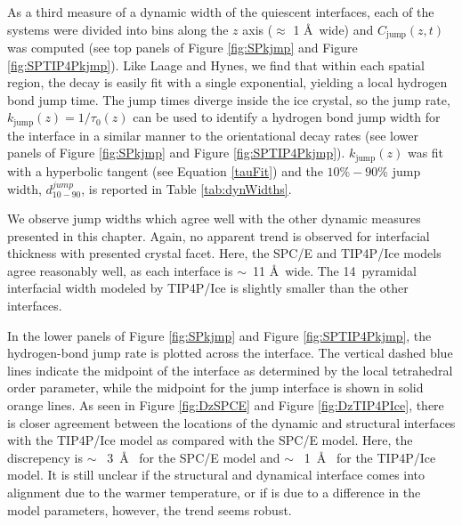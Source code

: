 As a third measure of a dynamic width of the quiescent
interfaces, each of the systems were divided into bins along the $z$
axis ($\approx$ 1 \AA\ wide) and $C_\mathrm{jump}(z,t)$ was computed
(see top panels of Figure \ref{fig:SPkjmp} and Figure
\ref{fig:SPTIP4Pkjmp}).  Like Laage and Hynes, we find that within
each spatial region, the decay is easily fit with a single
exponential, yielding a local hydrogen bond jump time. The jump times
diverge inside the ice crystal, so the jump rate,
$k_\mathrm{jump}(z) = 1 / \tau_0(z)$ can be used to identify a
hydrogen bond jump width for the interface in a similar manner to the
orientational decay rates (see lower panels of Figure \ref{fig:SPkjmp} and Figure
\ref{fig:SPTIP4Pkjmp}). $k_\mathrm{jump}(z)$ was fit with a hyperbolic
tangent (see Equation \eqref{tauFit}) and the $10\%-90\%$ jump width,
$d_\mathrm{10-90}^{jump}$, is reported in Table \ref{tab:dynWidths}.

We observe jump widths which agree well with the other dynamic
measures presented in this chapter. Again, no apparent trend is observed for
interfacial thickness with presented crystal facet. Here, the SPC/E
and TIP4P/Ice models agree reasonably well, as each interface is
$\sim$~11 \AA~wide. The 14\degree~pyramidal interfacial width modeled
by TIP4P/Ice is slightly smaller than the other interfaces.

In the lower panels of Figure \ref{fig:SPkjmp} and Figure
\ref{fig:SPTIP4Pkjmp}, the hydrogen-bond jump rate is plotted across
the interface. The vertical dashed blue lines indicate the midpoint of
the interface as determined by the local tetrahedral order parameter,
while the midpoint for the jump interface is shown in solid orange
lines. As seen in Figure \ref{fig:DzSPCE} and Figure
\ref{fig:DzTIP4PIce}, there is closer agreement between the locations
of the dynamic and structural interfaces with the TIP4P/Ice model as
compared with the SPC/E model. Here, the discrepency is $\sim$~ 3~\AA~
for the SPC/E model and $\sim$~ 1~\AA~ for the TIP4P/Ice model. It is
still unclear if the structural and dynamical interface comes into
alignment due to the warmer temperature, or if is due to a difference
in the model parameters, however, the trend seems robust.


